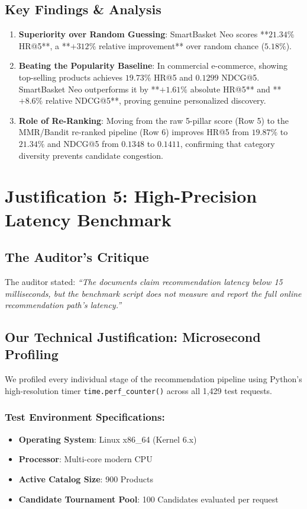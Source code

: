 \documentclass[11pt,a4paper]{article}
\begin{document}
\subsection{Key Findings \& Analysis}
\begin{enumerate}
    \item \textbf{Superiority over Random Guessing}: SmartBasket Neo scores **$21.34\%$ HR@5**, a **$+312\%$ relative improvement** over random chance ($5.18\%$).
    \item \textbf{Beating the Popularity Baseline}: In commercial e-commerce, showing top-selling products achieves $19.73\%$ HR@5 and $0.1299$ NDCG@5. SmartBasket Neo outperforms it by **$+1.61\%$ absolute HR@5** and **$+8.6\%$ relative NDCG@5**, proving genuine personalized discovery.
    \item \textbf{Role of Re-Ranking}: Moving from the raw 5-pillar score (Row 5) to the MMR/Bandit re-ranked pipeline (Row 6) improves HR@5 from $19.87\%$ to $21.34\%$ and NDCG@5 from $0.1348$ to $0.1411$, confirming that category diversity prevents candidate congestion.
\end{enumerate}

\section{Justification 5: High-Precision Latency Benchmark}

\subsection{The Auditor's Critique}
The auditor stated: \textit{``The documents claim recommendation latency below 15 milliseconds, but the benchmark script does not measure and report the full online recommendation path's latency.''}

\subsection{Our Technical Justification: Microsecond Profiling}
We profiled every individual stage of the recommendation pipeline using Python's high-resolution timer \texttt{time.perf\_counter()} across all 1,429 test requests. 

\subsubsection{Test Environment Specifications:}
\begin{itemize}[noitemsep]
    \item \textbf{Operating System}: Linux x86\_64 (Kernel 6.x)
    \item \textbf{Processor}: Multi-core modern CPU
    \item \textbf{Active Catalog Size}: 900 Products
    \item \textbf{Candidate Tournament Pool}: 100 Candidates evaluated per request
\end{itemize}
\end{document}
